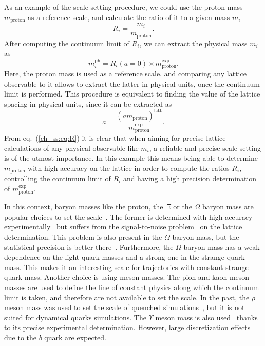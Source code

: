 As an example of the scale setting procedure, we could use the proton mass $m_{\textrm{proton}}$ as a reference scale, and calculate the ratio of it to a given mass $m_i$
\begin{equation}
R_i=\frac{m_i}{m_{\textrm{proton}}}.
\end{equation}
After computing the continuum limit of $R_i$, we can extract the physical mass $m_i$ as
\begin{equation}
\label{ch_ss:eq:R}
m_i^{\textrm{ph}}=R_i(a=0)\times m_{\textrm{proton}}^{\textrm{exp}}.
\end{equation}
Here, the proton mass is used as a reference scale, and comparing any lattice observable to it allows to extract the latter in physical units, once the continuum limit is performed. This procedure is equivalent to finding the value of the lattice spacing in physical units, since it can be extracted as 
\begin{equation}
a=\frac{(am_{\textrm{proton}})^{\textrm{latt}}}{m_{\textrm{proton}}^{\textrm{exp}}}.
\end{equation}
From eq.~(\ref{ch_ss:eq:R}) it is clear that when aiming for precise lattice calculations of any physical observable like $m_i$, a reliable and precise scale setting is of the utmost importance. In this example this means being able to determine $m_{\textrm{proton}}$ with high accuracy on the lattice in order to compute the ratios $R_i$, controlling the continuum limit of $R_i$ and having a high precision determination of $m_{\textrm{proton}}^{\textrm{exp}}$.

In this context, baryon masses like the proton, the $\Xi$ or the $\Omega$ baryon mass are popular choices to set the scale~\citep{BMW:2012hcm,Miller:2020evg,RQCD_scale}. The former is determined with high accuracy experimentally~\citep{ParticleDataGroup:2020ssz} but suffers from the signal-to-noise problem~\citep{Lepage:1989hd,Luscher:2010ae} on the lattice determination. This problem is also present in the $\Omega$ baryon mass, but the statistical precision is better there~\citep{BMW:2012hcm,Miller:2020evg}. Furthermore, the $\Omega$ baryon mass has a weak dependence on the light quark masses and a strong one in the strange quark mass. This makes it an interesting scale for trajectories with constant strange quark mass. Another choice is using meson masses. The pion and kaon meson masses are used to define the line of constant physics along which the continuum limit is taken, and therefore are not available to set the scale. In the past, the $\rho$ meson mass was used to set the scale of quenched simulations~\citep{Mawhinney:1996jk,Irving:1998yu,Bornyakov:2015plz}, but it is not suited for dynamical quarks simulations. The $\Upsilon$ meson mass is also used~\citep{HPQCD:2011qw,Gray:2005ur} thanks to its precise experimental determination. However, large discretization effects due to the $b$ quark are expected. 

